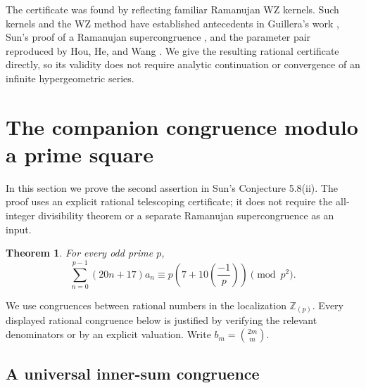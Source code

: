 \documentclass[11pt,a4paper]{article}
\newtheorem{theorem}{Theorem}[section]
\theoremstyle{remark}\newtheorem{remark}[theorem]{Remark}
\newcommand{\Z}{\mathbb Z}\newcommand{\Q}{\mathbb Q}
\begin{document}
The certificate was found by reflecting familiar Ramanujan WZ
kernels. Such kernels and the WZ method have established antecedents
in Guillera's work \cite{Guillera}, Sun's proof of a Ramanujan
supercongruence \cite[Section~3]{SunRefinement}, and the parameter
pair reproduced by Hou, He, and Wang \cite[arXiv v4, (4.1)]{HHW}.
We give the resulting rational certificate directly, so its
validity does not require analytic continuation or convergence
of an infinite hypergeometric series.



\section{The companion congruence modulo a prime square}
\label{sec:companion}

In this section we prove the second assertion in Sun's
Conjecture 5.8(ii). The proof uses an explicit rational telescoping
certificate; it does not require the all-integer divisibility theorem
or a separate Ramanujan supercongruence as an input.

\begin{theorem}\label{p2:main}
For every odd prime \(p\),
\[
 \sum_{n=0}^{p-1}(20n+17)a_n
 \equiv p\left(7+10\left(\frac{-1}{p}\right)\right)
 \pmod{p^2}.
\]
\end{theorem}

We use congruences between rational numbers in the localization
\(\Z_{(p)}\). Every displayed rational congruence below is justified
by verifying the relevant denominators or by an explicit valuation.
Write \(b_m=\binom{2m}{m}\).

\subsection{A universal inner-sum congruence}
\end{document}
